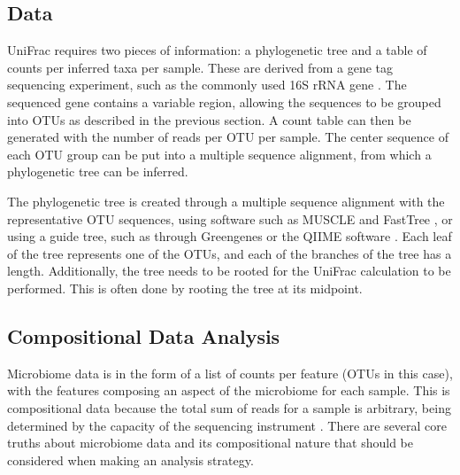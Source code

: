 \documentclass[10pt,letterpaper]{article}
\begin{document}
\subsection{Data}
UniFrac requires two pieces of information: a phylogenetic tree and a table of counts per inferred taxa per sample. These are derived from a gene tag sequencing experiment, such as the commonly used 16S rRNA gene \cite{tringe2008renaissance}. The sequenced gene contains a variable region, allowing the sequences to be grouped into OTUs as described in the previous section. A count table can then be generated with the number of reads per OTU per sample. The center sequence of each OTU group can be put into a multiple sequence alignment, from which a phylogenetic tree can be inferred.

The phylogenetic tree is created through a multiple sequence alignment with the representative OTU sequences, using software such as MUSCLE \cite{edgar2004muscle} and FastTree \cite{price2010fasttree}, or using a guide tree, such as through Greengenes \cite{desantis2006greengenes} or the QIIME software \cite{caporaso2010qiime}. Each leaf of the tree represents one of the OTUs, and each of the branches of the tree has a length. Additionally, the tree needs to be rooted for the UniFrac calculation to be performed. This is often done by rooting the tree at its midpoint.

\subsection{Compositional Data Analysis}
Microbiome data is in the form of a list of counts per feature (OTUs in this case), with the features composing an aspect of the microbiome for each sample. This is compositional data because the total sum of reads for a sample is arbitrary, being determined by the capacity of the sequencing instrument \cite{fernandes2013anova} \cite{fernandes2014unifying} \cite{gloor2010microbiome}. There are several core truths about microbiome data and its compositional nature that should be considered when making an analysis strategy.
\end{document}
